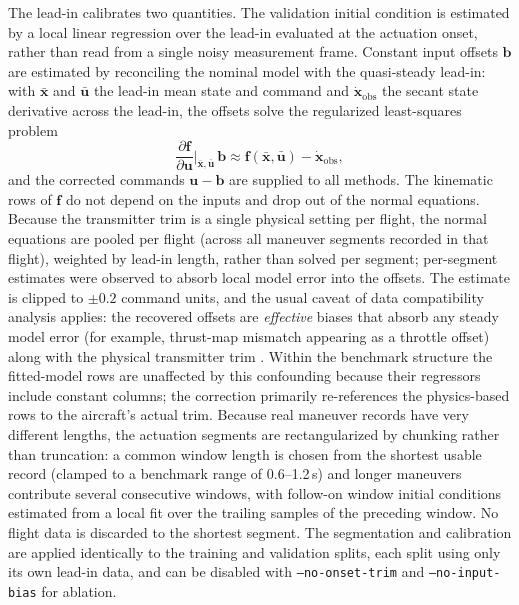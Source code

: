 \documentclass[11pt]{article}
\begin{document}
The lead-in calibrates two quantities. The validation initial condition is
estimated by a local linear regression over the lead-in evaluated at the
actuation onset, rather than read from a single noisy measurement frame.
Constant input offsets $\mathbf{b}$ are estimated by reconciling the nominal
model with the quasi-steady lead-in: with $\bar{\mathbf{x}}$ and
$\bar{\mathbf{u}}$ the lead-in mean state and command and
$\dot{\mathbf{x}}_{\mathrm{obs}}$ the secant state derivative across the
lead-in, the offsets solve the regularized least-squares problem
\begin{equation}
    \frac{\partial \mathbf{f}}{\partial \mathbf{u}}
    \Big|_{\bar{\mathbf{x}},\bar{\mathbf{u}}}\,\mathbf{b}
    \approx \mathbf{f}(\bar{\mathbf{x}},\bar{\mathbf{u}})
    - \dot{\mathbf{x}}_{\mathrm{obs}},
    \label{eq:input_bias}
\end{equation}
and the corrected commands $\mathbf{u}-\mathbf{b}$ are supplied to all
methods. The kinematic rows of $\mathbf{f}$ do not depend on the inputs and
drop out of the normal equations. Because the transmitter trim is a single
physical setting per flight, the normal equations are pooled per flight
(across all maneuver segments recorded in that flight), weighted by lead-in
length, rather than solved per segment; per-segment estimates were observed to
absorb local model error into the offsets. The estimate is clipped to $\pm0.2$ command units, and the usual
caveat of data compatibility analysis applies: the recovered offsets are
\emph{effective} biases that absorb any steady model error (for example,
thrust-map mismatch appearing as a throttle offset) along with the physical
transmitter trim \citep{KleinMorelli2006}. Within the benchmark structure the
fitted-model rows are unaffected by this confounding because their regressors
include constant columns; the correction primarily re-references the
physics-based rows to the aircraft's actual trim. Because real maneuver
records have very different lengths, the actuation segments are
rectangularized by chunking rather than truncation: a common window length is
chosen from the shortest usable record (clamped to a benchmark range of
0.6--1.2\,s) and longer maneuvers contribute several consecutive windows, with
follow-on window initial conditions estimated from a local fit over the
trailing samples of the preceding window. No flight data is discarded to the
shortest segment. The segmentation and calibration are applied identically to
the training and validation splits, each split using only its own lead-in
data, and can be disabled with \texttt{--no-onset-trim} and
\texttt{--no-input-bias} for ablation.
\end{document}
